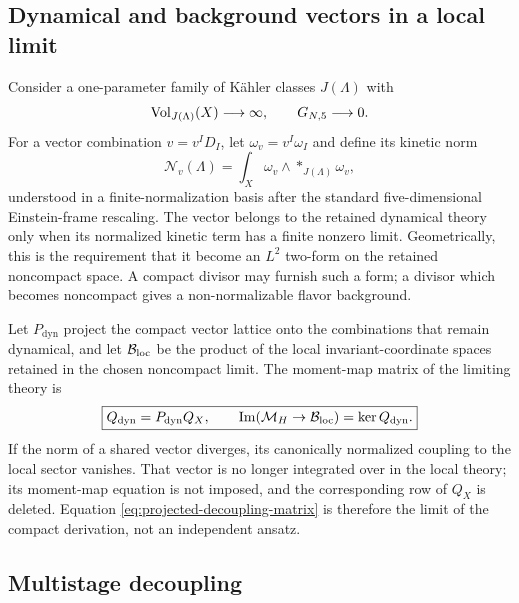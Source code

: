 \subsection{Dynamical and background vectors in a local limit}
\label{subsec:dynamic-background}

Consider a one-parameter family of K\"ahler classes $J(\Lambda)$ with
\begin{equation}
 \operatorname{Vol}_{J(\Lambda)}(X)\longrightarrow\infty,
 \qquad
 G_{N,5}\longrightarrow0.
 \label{eq:gravity-decoupling}
\end{equation}
For a vector combination $v=v^ID_I$, let
$\omega_v=v^I\omega_I$ and define its kinetic norm
\begin{equation}
 \mathcal N_v(\Lambda)
 =\int_X\omega_v\wedge*_{J(\Lambda)}\omega_v,
 \label{eq:vector-norm}
\end{equation}
understood in a finite-normalization basis after the standard five-dimensional
Einstein-frame rescaling. The vector belongs to the retained dynamical theory
only when its normalized kinetic term has a finite nonzero limit. Geometrically,
this is the requirement that it become an $L^2$ two-form on the retained
noncompact space. A compact divisor may furnish such a form; a divisor which
becomes noncompact gives a non-normalizable flavor background.

Let $P_{\mathrm{dyn}}$ project the compact vector lattice onto the combinations
that remain dynamical, and let $\mathcal B_{\mathrm{loc}}$ be the product of the
local invariant-coordinate spaces retained in the chosen noncompact limit.
The moment-map matrix of the limiting theory is
\begin{equation}
 \boxed{
 Q_{\mathrm{dyn}}=P_{\mathrm{dyn}}Q_X,
 \qquad
 \operatorname{Im}(\mathcal M_H\to\mathcal B_{\mathrm{loc}})
 =\ker Q_{\mathrm{dyn}}.}
 \label{eq:projected-decoupling-matrix}
\end{equation}
If the norm of a shared vector diverges, its canonically normalized coupling
to the local sector vanishes. That vector is no longer integrated over in the
local theory; its moment-map equation is not imposed, and the corresponding
row of $Q_X$ is deleted. Equation \eqref{eq:projected-decoupling-matrix} is
therefore the limit of the compact derivation, not an independent ansatz.

\subsection{Multistage decoupling}
\label{subsec:multistage}

